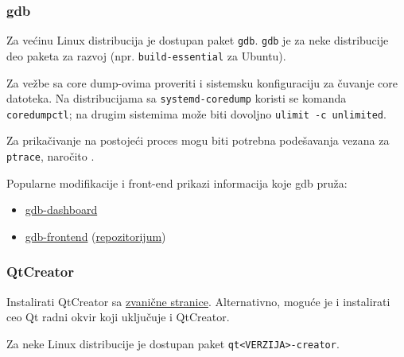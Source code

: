 \subsubsection{gdb}\label{instalacija-gdb}

Za većinu Linux distribucija je dostupan paket \texttt{gdb}. \texttt{gdb} je za neke distribucije deo paketa za razvoj (npr. \texttt{build-essential} za Ubuntu).

Za vežbe sa core dump-ovima proveriti i sistemsku konfiguraciju za čuvanje core datoteka. Na distribucijama sa \texttt{systemd-coredump} koristi se komanda \texttt{coredumpctl}; na drugim sistemima može biti dovoljno \texttt{ulimit -c unlimited}.

Za prikačivanje na postojeći proces mogu biti potrebna podešavanja vezana za \texttt{ptrace}, naročito .

Popularne modifikacije i front-end prikazi informacija koje gdb pruža:

\begin{itemize}
\tightlist
\item
  \href{https://github.com/cyrus-and/gdb-dashboard}{gdb-dashboard}
\item
  \href{https://debugme.dev/}{gdb-frontend} (\href{https://github.com/rohanrhu/gdb-frontend}{repozitorijum})
\end{itemize}

\subsubsection{QtCreator}\label{qtcreator}

Instalirati QtCreator sa \href{https://www.qt.io/download}{zvanične stranice}. Alternativno, moguće je i instalirati ceo Qt radni okvir koji uključuje i QtCreator.

Za neke Linux distribucije je dostupan paket \texttt{qt\textless{}VERZIJA\textgreater{}-creator}.
